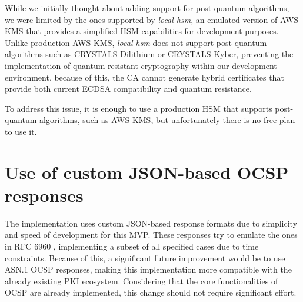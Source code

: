 While we initially thought about adding support for post-quantum algorithms, we were limited by the ones 
supported by \textit{local-hsm}, an emulated version of AWS KMS that provides a 
simplified HSM capabilities for development purposes. Unlike production AWS KMS, \textit{local-hsm} does 
not support post-quantum algorithms such as CRYSTALS-Dilithium or CRYSTALS-Kyber, preventing the 
implementation of quantum-resistant cryptography within our development environment. because of this,
the CA cannot generate hybrid certificates that provide both current ECDSA compatibility 
and quantum resistance.

To address this issue, it is enough to use a production HSM that supports post-quantum algorithms, such as AWS KMS,
but unfortunately there is no free plan to use it.

\section{Use of custom JSON-based OCSP responses}

The implementation uses custom JSON-based response formats due to simplicity and speed of development 
for this MVP. These responses try to emulate the ones in RFC 6960 \cite{rfc6960}, implementing a subset of all
specified cases due to time constraints.
Because of this, a significant future improvement would be to use ASN.1 OCSP responses, making this 
implementation more compatible with the already existing PKI ecosystem. Considering that the core 
functionalities of OCSP are already implemented, this change should not require significant effort.
